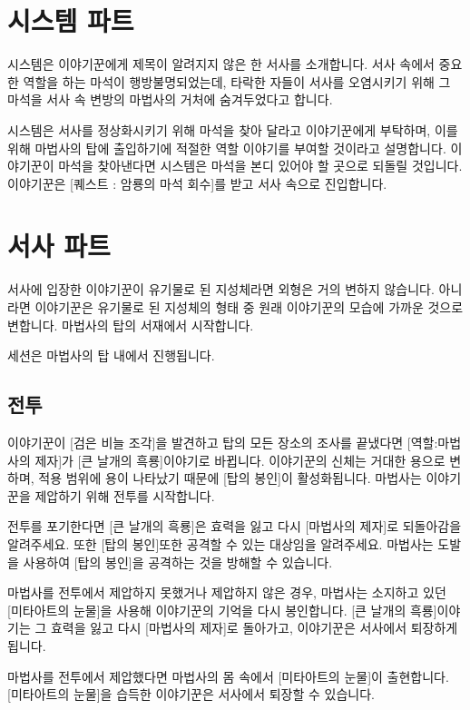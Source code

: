 \documentclass{report}
\begin{document}
	\section{시스템 파트}
		시스템은 이야기꾼에게 제목이 알려지지 않은 한 서사를 소개합니다. 서사 속에서 중요한 역할을 하는 마석이 행방불명되었는데, 타락한 자들이 서사를 오염시키기 위해 그 마석을 서사 속 변방의 마법사의 거처에 숨겨두었다고 합니다.
		
		시스템은 서사를 정상화시키기 위해 마석을 찾아 달라고 이야기꾼에게 부탁하며, 이를 위해 마법사의 탑에 출입하기에 적절한 역할 이야기를 부여할 것이라고 설명합니다. 이야기꾼이 마석을 찾아낸다면 시스템은 마석을 본디 있어야 할 곳으로 되돌릴 것입니다. 이야기꾼은 [퀘스트 : 암룡의 마석 회수]를 받고 서사 속으로 진입합니다.
	
	\section{서사 파트}
		서사에 입장한 이야기꾼이 유기물로 된 지성체라면 외형은 거의 변하지 않습니다. 아니라면 이야기꾼은 유기물로 된 지성체의 형태 중 원래 이야기꾼의 모습에 가까운 것으로 변합니다. 마법사의 탑의 서재에서 시작합니다.  
		
		세션은 마법사의 탑 내에서 진행됩니다.
		
			\subsection{전투}
				이야기꾼이 [검은 비늘 조각]을 발견하고 탑의 모든 장소의 조사를 끝냈다면 [역할:마법사의 제자]가 [큰 날개의 흑룡]이야기로 바뀝니다. 이야기꾼의 신체는 거대한 용으로 변하며, 적용 범위에 용이 나타났기 때문에 [탑의 봉인]이 활성화됩니다. 마법사는 이야기꾼을 제압하기 위해 전투를 시작합니다.
				
				전투를 포기한다면 [큰 날개의 흑룡]은 효력을 잃고 다시 [마법사의 제자]로 되돌아감을 알려주세요. 또한 [탑의 봉인]또한 공격할 수 있는 대상임을 알려주세요. 마법사는 도발을 사용하여 [탑의 봉인]을 공격하는 것을 방해할 수 있습니다.
				
				마법사를 전투에서 제압하지 못했거나 제압하지 않은 경우, 마법사는 소지하고 있던 [미타아트의 눈물]을 사용해 이야기꾼의 기억을 다시 봉인합니다. [큰 날개의 흑룡]이야기는 그 효력을 잃고 다시 [마법사의 제자]로 돌아가고, 이야기꾼은 서사에서 퇴장하게 됩니다.
				
				마법사를 전투에서 제압했다면 마법사의 몸 속에서 [미타아트의 눈물]이 출현합니다. [미타아트의 눈물]을 습득한 이야기꾼은 서사에서 퇴장할 수 있습니다.
	
\end{document}
